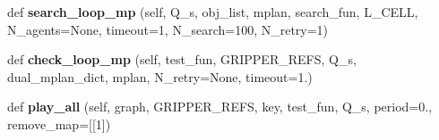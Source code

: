 \begin{DoxyCompactItemize}
\item 
\mbox{\label{classrnb-planning_1_1src_1_1pkg_1_1data__collecting_1_1sampling_1_1_data_collector_a406f00280a8511bf9440ebb7a83d4039}} 
def {\bfseries search\+\_\+loop\+\_\+mp} (self, Q\+\_\+s, obj\+\_\+list, mplan, search\+\_\+fun, L\+\_\+\+C\+E\+LL, N\+\_\+agents=None, timeout=1, N\+\_\+search=100, N\+\_\+retry=1)
\item 
\mbox{\label{classrnb-planning_1_1src_1_1pkg_1_1data__collecting_1_1sampling_1_1_data_collector_afef5ac0af05719ca29fe651112f18870}} 
def {\bfseries check\+\_\+loop\+\_\+mp} (self, test\+\_\+fun, G\+R\+I\+P\+P\+E\+R\+\_\+\+R\+E\+FS, Q\+\_\+s, dual\+\_\+mplan\+\_\+dict, mplan, N\+\_\+retry=None, timeout=1.)
\item 
\mbox{\label{classrnb-planning_1_1src_1_1pkg_1_1data__collecting_1_1sampling_1_1_data_collector_a56bad8994dddb8e8c58bd348620f3fd4}} 
def {\bfseries play\+\_\+all} (self, graph, G\+R\+I\+P\+P\+E\+R\+\_\+\+R\+E\+FS, key, test\+\_\+fun, Q\+\_\+s, period=0., remove\+\_\+map=\mbox{[}\mbox{[}1\mbox{]})
\end{DoxyCompactItemize}
